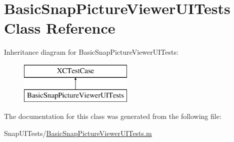 \hypertarget{interface_basic_snap_picture_viewer_u_i_tests}{}\section{Basic\+Snap\+Picture\+Viewer\+U\+I\+Tests Class Reference}
\label{interface_basic_snap_picture_viewer_u_i_tests}
Inheritance diagram for Basic\+Snap\+Picture\+Viewer\+U\+I\+Tests\+:\begin{figure}[H]
\begin{center}
\leavevmode
\includegraphics[height=2.000000cm]{interface_basic_snap_picture_viewer_u_i_tests}
\end{center}
\end{figure}


The documentation for this class was generated from the following file\+:\begin{DoxyCompactItemize}
\item 
Snap\+U\+I\+Tests/\hyperlink{_basic_snap_picture_viewer_u_i_tests_8m}{Basic\+Snap\+Picture\+Viewer\+U\+I\+Tests.\+m}\end{DoxyCompactItemize}
